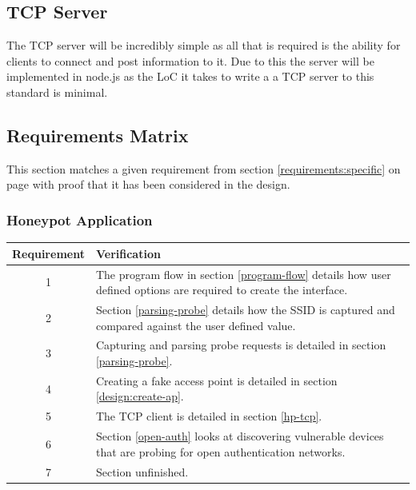 \subsection{TCP Server}
The TCP server will be incredibly simple as all that is required is the ability for clients to connect and post information to it. Due to this the server will be implemented in node.js as the LoC it takes to write a a TCP server to this standard is minimal.

\clearpage
\subsection{Requirements Matrix}
This section matches a given requirement from section \ref{requirements:specific} on page \pageref{requirements:specific} with proof that it has been considered in the design. 
\subsubsection{Honeypot Application}
\begin{table}[!h]
	\begin{center}
		\begin{tabular}{ | c |  p{12cm} | }
			\hline
			\textbf{Requirement} & \textbf{Verification} \\ \hline
			1 & The program flow in section \ref{program-flow} details how user defined options are required to create the interface.\\ \hline
			2 & Section \ref{parsing-probe} details how the SSID is captured and compared against the user defined value.\\ \hline
			3 & Capturing and parsing probe requests is detailed in section \ref{parsing-probe}. \\ \hline
			4 & Creating a fake access point is detailed in section \ref{design:create-ap}.\\ \hline
			5 & The TCP client is detailed in section \ref{hp-tcp}.\\ \hline
			6 & Section \ref{open-auth} looks at discovering vulnerable devices that are probing for open authentication networks. \\ \hline
			7 & Section unfinished.\\ 
			\hline
		\end{tabular}
	\end{center}
\end{table}

